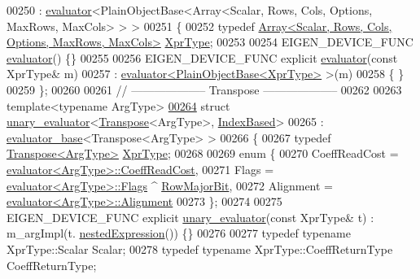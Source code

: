 \begin{DoxyCode}
00250   : \hyperlink{struct_eigen_1_1internal_1_1evaluator}{evaluator}<PlainObjectBase<Array<Scalar, Rows, Cols, Options, MaxRows, MaxCols> > >
00251 \{
00252   \textcolor{keyword}{typedef} \hyperlink{group___core___module_class_eigen_1_1_array}{Array<Scalar, Rows, Cols, Options, MaxRows, MaxCols>}
       \hyperlink{group___core___module_class_eigen_1_1_array}{XprType};
00253 
00254   EIGEN\_DEVICE\_FUNC \hyperlink{struct_eigen_1_1internal_1_1evaluator}{evaluator}() \{\}
00255   
00256   EIGEN\_DEVICE\_FUNC \textcolor{keyword}{explicit} \hyperlink{struct_eigen_1_1internal_1_1evaluator}{evaluator}(\textcolor{keyword}{const} XprType& m)
00257     : \hyperlink{struct_eigen_1_1internal_1_1evaluator}{evaluator<PlainObjectBase<XprType>} >(m) 
00258   \{ \}
00259 \};
00260 
00261 \textcolor{comment}{// -------------------- Transpose --------------------}
00262 
00263 \textcolor{keyword}{template}<\textcolor{keyword}{typename} ArgType>
\hyperlink{struct_eigen_1_1internal_1_1unary__evaluator_3_01_transpose_3_01_arg_type_01_4_00_01_index_based_01_4}{00264} \textcolor{keyword}{struct }\hyperlink{struct_eigen_1_1internal_1_1unary__evaluator}{unary\_evaluator}<\hyperlink{group___core___module_class_eigen_1_1_transpose}{Transpose}<ArgType>, \hyperlink{struct_eigen_1_1internal_1_1_index_based}{IndexBased}>
00265   : \hyperlink{struct_eigen_1_1internal_1_1evaluator__base}{evaluator\_base}<Transpose<ArgType> >
00266 \{
00267   \textcolor{keyword}{typedef} \hyperlink{group___core___module_class_eigen_1_1_transpose}{Transpose<ArgType>} \hyperlink{group___core___module_class_eigen_1_1_transpose}{XprType};
00268   
00269   \textcolor{keyword}{enum} \{
00270     CoeffReadCost = \hyperlink{struct_eigen_1_1internal_1_1evaluator}{evaluator<ArgType>::CoeffReadCost},    
00271     Flags = \hyperlink{struct_eigen_1_1internal_1_1evaluator}{evaluator<ArgType>::Flags} ^ \hyperlink{group__flags_gae4f56c2a60bbe4bd2e44c5b19cbe8762}{RowMajorBit},
00272     Alignment = \hyperlink{struct_eigen_1_1internal_1_1evaluator}{evaluator<ArgType>::Alignment}
00273   \};
00274 
00275   EIGEN\_DEVICE\_FUNC \textcolor{keyword}{explicit} \hyperlink{struct_eigen_1_1internal_1_1unary__evaluator}{unary\_evaluator}(\textcolor{keyword}{const} XprType& t) : m\_argImpl(t.
      \hyperlink{group___core___module_a72aefbf67f5e3caf62a99f73409b4a63}{nestedExpression}()) \{\}
00276 
00277   \textcolor{keyword}{typedef} \textcolor{keyword}{typename} XprType::Scalar Scalar;
00278   \textcolor{keyword}{typedef} \textcolor{keyword}{typename} XprType::CoeffReturnType CoeffReturnType;

\end{DoxyCode}
